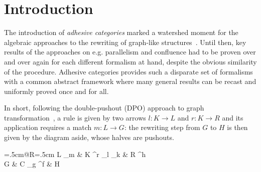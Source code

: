 \documentclass[3p]{elsarticle}
\theoremstyle{remark}
\theoremstyle{definition}
\begin{document}
\maketitle


\section{Introduction}
The introduction of \emph{adhesive categories} marked a watershed moment for the algebraic approaches 
to the rewriting of graph-like structures~\cite{lack2005adhesive,ehrig2006fundamentals}.
%
Until then, key results of the approaches on e.g. parallelism and confluence had to be proven 
over and over again for each different formalism at hand, %
despite the obvious similarity of the procedure.
%
Adhesive categories provides such a disparate set of formalisms with a common abstract framework 
where many general results can be recast and uniformly proved once and for all.
 
\noindent
\begin{minipage}[l]{.78\linewidth}
		\setlength{\parindent}{1.5em}
		In short, following the double-pushout (DPO) approach
to graph transformation~\cite{CorradiniMREHL97,ehrig2006fundamentals}, 
a rule is given by two arrows $l: K \to L$ and $r: K \rightarrow R$
and its application requires a match $m: L \to G$: the rewriting step from $G$
to $H$ is then given by the diagram aside, whose halves are pushouts.
  \end{minipage}%
    \hfill 
  \begin{minipage}[r]{.20\linewidth }
    \xymatrix@C=.5cm@R=.5cm{
      L \ar[d]_{m}
      & K \ar[r]^r \ar[l]_{l} \ar[d]_{k} & R \ar [d]^h \\
      G & C \ar[r]_{g} \ar[l]^{f}                    & H
    }
  \end{minipage}
  \vspace{.01cm}
\end{document}
